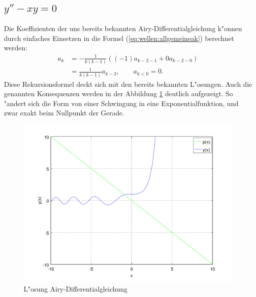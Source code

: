 \subsection{\texorpdfstring{$y''-xy = 0$}{y''-xy = 0}}
Die Koeffizienten der uns bereits bekannten Airy-Differentialgleichung k"onnen 
durch einfaches Einsetzen in die Formel (\ref{eq:wellen:allgemeineak}) 
berechnet werden:
\begin{equation*}
	\begin{split}
		a_k &= -\frac{1}{k(k-1)} ((-1) a_{k-2-1} + 
		0 a_{k-2-0})
		\\
		&= \frac{1}{k(k-1)} a_{k-3}, \qquad a_{k < 0} = 0.
	\end{split}
\end{equation*}
Diese Rekursionsformel deckt sich mit den bereits bekannten L"osungen.
Auch die genannten Konsequenzen werden in der Abbildung 
\ref{fig:wellen:airy-dgl} deutlich aufgezeigt. So "andert sich die Form von 
einer Schwingung in eine Exponentialfunktion, und zwar exakt beim Nullpunkt der 
Gerade.

\begin{figure}
	\includegraphics[width=1\hsize]{./wellen/images/allgemein/n1.pdf}
	\caption{L"osung Airy-Differentialgleichung}
	\label{fig:wellen:airy-dgl}
\end{figure}